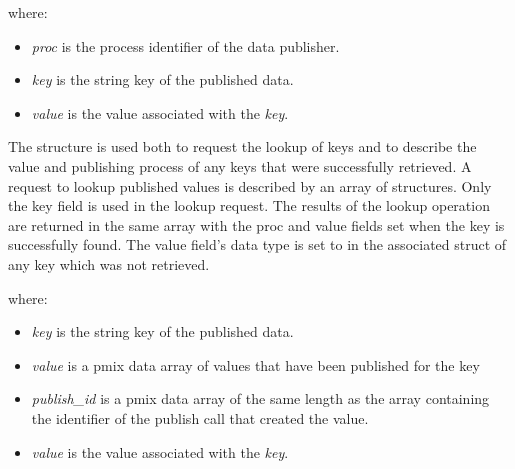 where:
\begin{itemize}
    \item \emph{proc} is the process identifier of the data publisher.
    \item \emph{key} is the string key of the published data.
    \item \emph{value} is the value associated with the \emph{key}.
\end{itemize}


The  structure is used both to request the lookup of keys and to describe the value and publishing process of any keys that were successfully retrieved.
A request to lookup published values is described by an array of  structures.
Only the key field is used in the lookup request.
The results of the lookup operation are returned in the same array with the proc and value fields set when the key is successfully found.
The value field's data type is set to  in the associated  struct of any key which was not retrieved.
%

where:

\begin{itemize}
    \item \emph{key} is the string key of the published data.
    \item \emph{value} is a pmix data array of values that have been published for the key 
    \item \emph{publish_id} is a pmix data array of the same length as the  array containing the 
    identifier of the publish call that created the value.
    \item \emph{value} is the value associated with the \emph{key}.
\end{itemize}

\section{}

